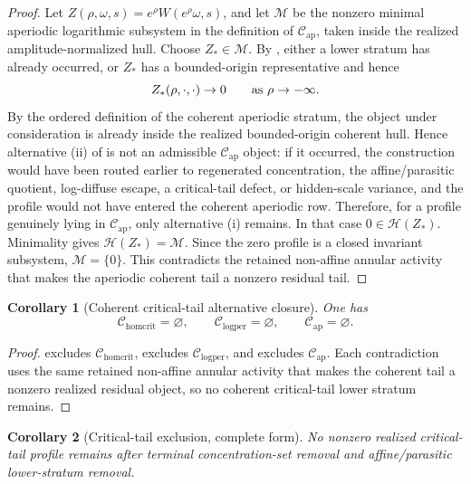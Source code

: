 \documentclass[11pt]{amsart}
\numberwithin{equation}{section}
\theoremstyle{plain}
\newtheorem{corollary}[corollary]{Corollary}
\theoremstyle{definition}
\theoremstyle{remark}
\newcommand{\Chomcrit}{\mathcal C_{\mathrm{homcrit}}}
\newcommand{\Clogper}{\mathcal C_{\mathrm{logper}}}
\newcommand{\Capcrit}{\mathcal C_{\mathrm{ap}}}
\begin{document}
\begin{proof}
Let \(Z(\rho,\omega,s)=e^\rho W(e^\rho\omega,s)\), and let \(\mathcal M\) be
the nonzero minimal aperiodic logarithmic subsystem in the definition of
\(\Capcrit\), taken inside the realized amplitude-normalized hull.  Choose
\(Z_*\in\mathcal M\).  By ,
either a lower stratum has already occurred, or \(Z_*\) has a bounded-origin
representative and hence
\[
   Z_*(\rho,\cdot,\cdot)\to0
   \qquad\hbox{as }\rho\to-\infty .
\]
By the ordered definition of the coherent aperiodic stratum, the object under
consideration is already inside the realized bounded-origin coherent hull.
Hence alternative \textup{(ii)} of
 is not an admissible
\(\Capcrit\) object: if it occurred, the construction would have been routed
earlier to regenerated concentration, the affine/parasitic quotient,
log-diffuse escape, a critical-tail defect, or hidden-scale variance, and the
profile would not have entered the coherent aperiodic row.  Therefore, for a
profile genuinely lying in \(\Capcrit\), only alternative \textup{(i)}
remains.  In that case \(0\in\mathcal H(Z_*)\).
Minimality gives \(\mathcal H(Z_*)=\mathcal M\).  Since the zero profile is a
closed invariant subsystem, \(\mathcal M=\{0\}\).  This contradicts the
retained non-affine annular activity that makes the aperiodic coherent tail a
nonzero residual tail.
\end{proof}

\begin{corollary}[Coherent critical-tail alternative closure]
\label{cor:coherent-critical-tail-branch-closure}
One has
\[
   \Chomcrit=\varnothing,\qquad
   \Clogper=\varnothing,\qquad
   \Capcrit=\varnothing .
\]
\end{corollary}

\begin{proof}
 excludes
\(\Chomcrit\),  excludes
\(\Clogper\), and  excludes
\(\Capcrit\).  Each contradiction uses the same retained non-affine annular
activity that makes the coherent tail a nonzero realized residual object, so no
coherent critical-tail lower stratum remains.
\end{proof}

\begin{corollary}[Critical-tail exclusion, complete form]
\label{cor:critical-tail-exclusion-complete}
No nonzero realized critical-tail profile remains after terminal
concentration-set removal and affine/parasitic lower-stratum removal.
\end{corollary}
\end{document}

